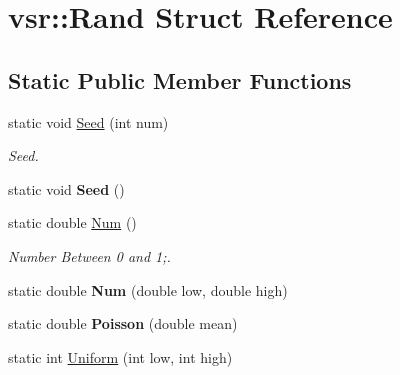 \hypertarget{structvsr_1_1_rand}{\section{vsr\-:\-:Rand Struct Reference}
\label{structvsr_1_1_rand}
}
\subsection*{Static Public Member Functions}
\begin{DoxyCompactItemize}
\item 
\hypertarget{structvsr_1_1_rand_a9e02922954db8dbf56b85a680059546b}{static void \hyperlink{structvsr_1_1_rand_a9e02922954db8dbf56b85a680059546b}{Seed} (int num)}\label{structvsr_1_1_rand_a9e02922954db8dbf56b85a680059546b}

\begin{DoxyCompactList}\small\item\em Seed. \end{DoxyCompactList}\item 
\hypertarget{structvsr_1_1_rand_aa7f57bea30034c7b94ddf1589c9eb0da}{static void {\bfseries Seed} ()}\label{structvsr_1_1_rand_aa7f57bea30034c7b94ddf1589c9eb0da}

\item 
\hypertarget{structvsr_1_1_rand_ad4a9ee8944950a1bcaa4fee74dfde9f4}{static double \hyperlink{structvsr_1_1_rand_ad4a9ee8944950a1bcaa4fee74dfde9f4}{Num} ()}\label{structvsr_1_1_rand_ad4a9ee8944950a1bcaa4fee74dfde9f4}

\begin{DoxyCompactList}\small\item\em Number Between 0 and 1;. \end{DoxyCompactList}\item 
\hypertarget{structvsr_1_1_rand_a9ea8224ac80bd0d4f438faa67ecaea5c}{static double {\bfseries Num} (double low, double high)}\label{structvsr_1_1_rand_a9ea8224ac80bd0d4f438faa67ecaea5c}

\item 
\hypertarget{structvsr_1_1_rand_a07b2c3392b4f989373bfc4f175afb387}{static double {\bfseries Poisson} (double mean)}\label{structvsr_1_1_rand_a07b2c3392b4f989373bfc4f175afb387}

\item 
\hypertarget{structvsr_1_1_rand_a029989285e0108c6603920565517cbb0}{static int \hyperlink{structvsr_1_1_rand_a029989285e0108c6603920565517cbb0}{Uniform} (int low, int high)}\label{structvsr_1_1_rand_a029989285e0108c6603920565517cbb0}


\end{DoxyCompactItemize}
